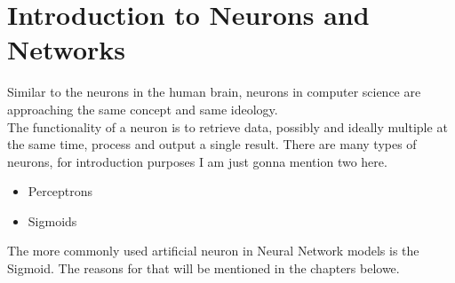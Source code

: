 
\section{Introduction to Neurons and Networks}
Similar to the neurons in the human brain, neurons in computer science are approaching the same concept and same ideology.\\
The functionality of a neuron is to retrieve data, possibly and ideally multiple at the same time, process and output a single result. There
are many types of neurons, for introduction purposes I am just gonna mention two here.
\begin{itemize}
    \item Perceptrons
    \item Sigmoids
\end{itemize}
The more commonly used artificial neuron in Neural Network models is the Sigmoid. The reasons for that will be mentioned in the chapters
belowe.

